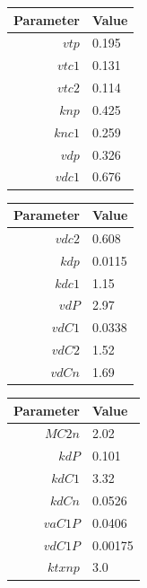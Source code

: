 \documentclass[11pt, letterpaper]{article}
\begin{document}
\begin{model}
\begin{tabular}{rl}
\toprule Parameter & Value\\\midrule
$vtp $  & 0.195   \\
$vtc1$  & 0.131   \\
$vtc2$  & 0.114   \\
$knp $  & 0.425   \\
$knc1$  & 0.259   \\
$vdp $  & 0.326   \\
$vdc1$  & 0.676   \\\bottomrule
\end{tabular}\hfil
%
\begin{tabular}{rl}
\toprule Parameter & Value\\\midrule
$vdc2$ & 0.608   \\
$kdp $ & 0.0115  \\
$kdc1$ & 1.15    \\
$vdP $ & 2.97    \\
$vdC1$ & 0.0338  \\
$vdC2$ & 1.52    \\
$vdCn$ & 1.69    \\\bottomrule
\end{tabular}\hfil
%
\begin{tabular}{rl}
\toprule Parameter & Value\\\midrule
$MC2n $ & 2.02    \\
$kdP  $ & 0.101   \\
$kdC1 $ & 3.32    \\
$kdCn $ & 0.0526  \\
$vaC1P$ & 0.0406  \\
$vdC1P$ & 0.00175 \\
$ktxnp$ & 3.0     \\\bottomrule
\end{tabular}
\end{model}
\end{document}

